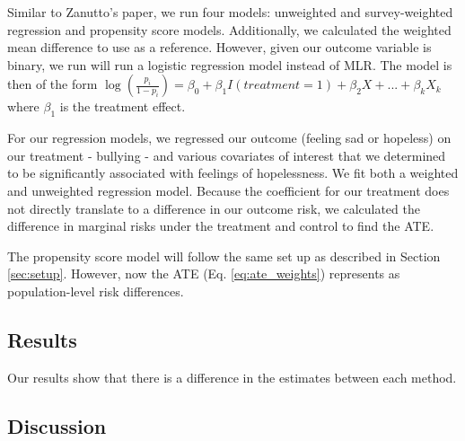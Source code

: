 \documentclass[12pt]{article}
\begin{document}
Similar to Zanutto's paper, we run four models: unweighted and survey-weighted regression and propensity score models. Additionally, we calculated the weighted mean difference to use as a reference. However, given our outcome variable is binary, we run will run a logistic regression model instead of MLR. The model is then of the form $\log(\frac{p_i}{1-p_i}) = \beta_0 + \beta_1I(treatment = 1) + \beta_2X + ... + \beta_kX_k$ where $\beta_1$ is the treatment effect. 

For our regression models, we regressed our outcome (feeling sad or hopeless) on our treatment - bullying - and various covariates of interest that we determined to be significantly associated with feelings of hopelessness. We fit both a weighted and unweighted regression model. Because the coefficient for our treatment does not directly translate to a difference in our outcome risk, we calculated the difference in marginal risks under the treatment and control to find the ATE.

The propensity score model will follow the same set up as described in Section \ref{sec:setup}. However, now the ATE (Eq. \ref{eq:ate_weights}) represents as population-level risk differences.

\subsection{Results}

Our results show that there is a difference in the estimates between each method.

\subsection{Discussion}




\end{document}
